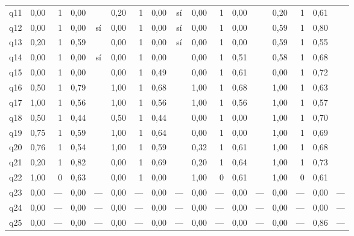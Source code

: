\begin{scriptsize}
\begin{longtable}{@{}l rrrc rrrc rrrc rrrc@{}}
q11 & 0,00 & 1 & 0,00 &  & 0,20 & 1 & 0,00 & sí & 0,00 & 1 & 0,00 &  & 0,20 & 1 & 0,61 &  \\
q12 & 0,00 & 1 & 0,00 & sí & 0,00 & 1 & 0,00 & sí & 0,00 & 1 & 0,00 &  & 0,59 & 1 & 0,80 &  \\
q13 & 0,20 & 1 & 0,59 &  & 0,00 & 1 & 0,00 & sí & 0,00 & 1 & 0,00 &  & 0,59 & 1 & 0,55 &  \\
q14 & 0,00 & 1 & 0,00 & sí & 0,00 & 1 & 0,00 &  & 0,00 & 1 & 0,51 &  & 0,58 & 1 & 0,68 &  \\
q15 & 0,00 & 1 & 0,00 &  & 0,00 & 1 & 0,49 &  & 0,00 & 1 & 0,61 &  & 0,00 & 1 & 0,72 &  \\
q16 & 0,50 & 1 & 0,79 &  & 1,00 & 1 & 0,68 &  & 1,00 & 1 & 0,68 &  & 1,00 & 1 & 0,63 &  \\
q17 & 1,00 & 1 & 0,56 &  & 1,00 & 1 & 0,56 &  & 1,00 & 1 & 0,56 &  & 1,00 & 1 & 0,57 &  \\
q18 & 0,50 & 1 & 0,44 &  & 0,50 & 1 & 0,44 &  & 0,00 & 1 & 0,00 &  & 1,00 & 1 & 0,70 &  \\
q19 & 0,75 & 1 & 0,59 &  & 1,00 & 1 & 0,64 &  & 0,00 & 1 & 0,00 &  & 1,00 & 1 & 0,69 &  \\
q20 & 0,76 & 1 & 0,54 &  & 1,00 & 1 & 0,59 &  & 0,32 & 1 & 0,61 &  & 1,00 & 1 & 0,68 &  \\
q21 & 0,20 & 1 & 0,82 &  & 0,00 & 1 & 0,69 &  & 0,20 & 1 & 0,64 &  & 1,00 & 1 & 0,73 &  \\
q22 & 1,00 & 0 & 0,63 &  & 0,00 & 1 & 0,00 &  & 1,00 & 0 & 0,61 &  & 1,00 & 0 & 0,61 &  \\
q23 & 0,00 & --- & 0,00 & --- & 0,00 & --- & 0,00 & --- & 0,00 & --- & 0,00 & --- & 0,00 & --- & 0,00 & --- \\
q24 & 0,00 & --- & 0,00 & --- & 0,00 & --- & 0,00 & --- & 0,00 & --- & 0,00 & --- & 0,00 & --- & 0,00 & --- \\
q25 & 0,00 & --- & 0,00 & --- & 0,00 & --- & 0,00 & --- & 0,00 & --- & 0,00 & --- & 0,00 & --- & 0,86 & --- \\
\bottomrule
\end{longtable}
\end{scriptsize}

